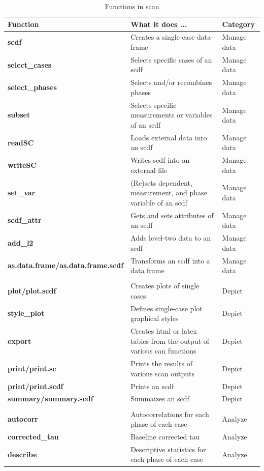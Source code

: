 \documentclass[
]{book}
\begin{document}
\begin{table}

\caption{\label{tab:table-functions}Functions in scan}
\begin{tabular}[t]{>{\raggedright\arraybackslash}p{15em}>{\raggedright\arraybackslash}p{30em}l}
\toprule
Function & What it does ... & Category\\
\midrule
\textbf{scdf} & Creates a single-case data-frame & Manage data\\
\textbf{select\_cases} & Selects specific cases of an scdf & Manage data\\
\textbf{select\_phases} & Selects and/or recombines phases & Manage data\\
\textbf{subset} & Selects specific measurements or variables of an scdf & Manage data\\
\textbf{readSC} & Loads external data into an scdf & Manage data\\
\textbf{writeSC} & Writes scdf into an external file & Manage data\\
\textbf{set\_var} & (Re)sets dependent, measurement, and phase variable of an scdf & Manage data\\
\textbf{scdf\_attr} & Gets and sets attributes of an scdf & Manage data\\
\textbf{add\_l2} & Adds level-two data to an scdf & Manage data\\
\textbf{as.data.frame/as.data.frame.scdf} & Transforms an scdf into a data frame & Manage data\\
\textbf{} &  \vphantom{3} & \\
\textbf{plot/plot.scdf} & Creates plots of single cases & Depict\\
\textbf{style\_plot} & Defines single-case plot graphical styles & Depict\\
\textbf{export} & Creates html or latex tables from the output of various can functions & Depict\\
\textbf{print/print.sc} & Prints the results of various scan outputs & Depict\\
\textbf{print/print.scdf} & Prints an scdf & Depict\\
\textbf{summary/summary.scdf} & Summaizes an scdf & Depict\\
\textbf{} &  \vphantom{2} & \\
\textbf{autocorr} & Autocorrelations for each phase of each case & Analyze\\
\textbf{corrected\_tau} & Baseline corrected tau & Analyze\\
\textbf{describe} & Descriptive statistics for each phase of each case & Analyze\\

\end{tabular}
\end{table}
\end{document}
